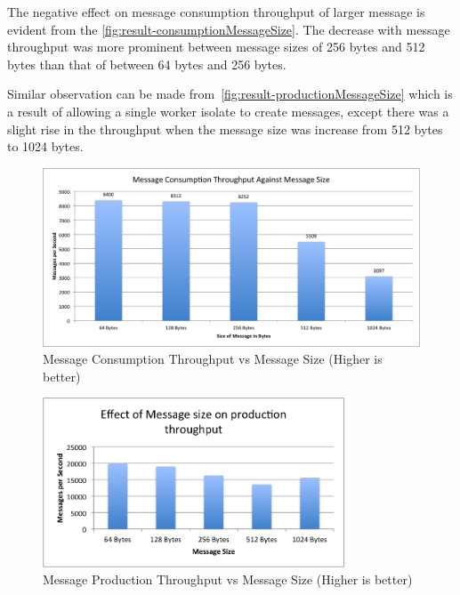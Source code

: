   The negative effect on message consumption throughput of larger message is evident from the  \autoref{fig:result-consumptionMessageSize}. The decrease with message throughput was more prominent between message sizes of 256 bytes and 512 bytes than that of between 64 bytes and 256 bytes.

  Similar observation can be made from~\autoref{fig:result-productionMessageSize} which is a result of allowing a single worker isolate to create messages, except there was a slight rise in the throughput when the message size was increase from 512 bytes to 1024 bytes.

\begin{figure}[H]
  \centering  \includegraphics[width=1\textwidth]{figures/02consumptionMessageSize}
  \caption[Message Consumption Throughput vs Message Size]{Message Consumption Throughput vs Message Size (Higher is better)}
  \label{fig:result-consumptionMessageSize}
\end{figure}

\begin{figure}[H]
  \centering  \includegraphics[width=0.8\textwidth]{figures/03productionMessageSize}
  \caption[Message Production Throughput vs Message Size]{Message Production Throughput vs Message Size (Higher is better)}
  \label{fig:result-productionMessageSize}
\end{figure}

